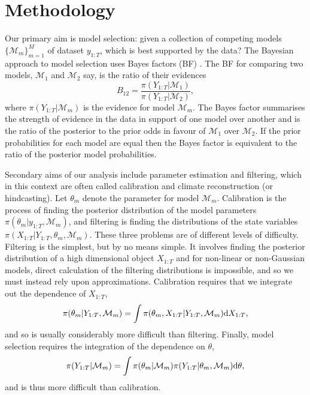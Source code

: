\documentclass[a4paper,12pt]{article}
\begin{document}
\clearpage
\color{black}
\section{Methodology}
\label{Sec:Meth}

Our primary aim is model selection: given a collection of competing models $\{\mathcal{M}_m\}_{m=1}^M$ of dataset $y_{1:T}$, which is best supported by the data? 
The Bayesian approach to model selection uses Bayes factors (BF) \cite{Jeffreys1939, Kass1995}. The BF for comparing two models, $\mathcal{M}_1$ and $\mathcal{M}_2$ say, is the ratio of their evidences
\begin{equation} \label{Eqn:BF}
B_{12} = \frac{\pi(Y_{1:T} \vert \mathcal{M}_1)}{\pi(Y_{1:T} \vert \mathcal{M}_2)},
\end{equation}
\noindent where $\pi(Y_{1:T} \vert \mathcal{M}_m)$ is the evidence  for model $\mathcal{M}_m$.
The Bayes factor summarises the strength of evidence in the data in support of one model over another and is the ratio of the posterior to the prior odds in favour of $\mathcal{M}_1$ over $\mathcal{M}_2$.
If the prior probabilities for each model are equal then the Bayes factor is equivalent to the ratio of the posterior model probabilities.

Secondary aims of our analysis include parameter estimation and filtering, which in this context are often called calibration and climate reconstruction (or hindcasting). Let $\theta_m$ denote the parameter for model $\mathcal{M}_m$. 
Calibration is the process of finding the posterior distribution of the model parameters $\pi(\theta_m | y_{1:T}, \mathcal{M}_m)$, and filtering is finding the distributions of the state variables $\pi(X_{1:T} | Y_{1:T}, \theta_m, \mathcal{M}_m)$. These three problems are of different levels of difficulty. Filtering is the simplest, but by no means simple. It involves finding the posterior distribution of a high dimensional object $X_{1:T}$ and for non-linear or non-Gaussian models, direct calculation of the filtering distributions is impossible, and so we must instead rely upon approximations.
Calibration requires that we integrate out the dependence of $X_{1:T}$, 
\begin{equation}
\pi (\theta_m \vert Y_{1:T}, \mathcal{M}_m) = \int \pi(\theta_m, X_{1:T} \vert Y_{1:T}, \mathcal{M}_m) {\rm d}X_{1:T},
\end{equation}
and so is usually considerably more difficult than filtering. 
Finally, model selection requires the integration of the dependence on $\theta$, 
\begin{equation}
\pi (Y_{1:T} \vert \mathcal{M}_m) = \int \pi(\theta_m \vert \mathcal{M}_m) \pi(Y_{1:T} \vert \theta_m, \mathcal{M}_m) {\rm d}\theta,
\end{equation}
and is thus more difficult than calibration. 
\end{document}
